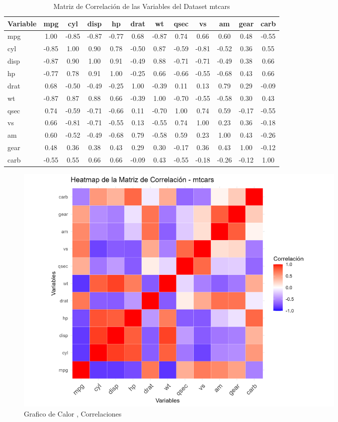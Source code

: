 \documentclass{article}
\begin{document}
\begin{table}[h]
	\centering
	\begin{tabular}{lccccccccccc}
		\hline
		Variable & mpg   & cyl   & disp  & hp    & drat  & wt    & qsec  & vs    & am    & gear  & carb  \\ \hline
		mpg      & 1.00  & -0.85 & -0.87 & -0.77 & 0.68  & -0.87 & 0.74  & 0.66  & 0.60  & 0.48  & -0.55 \\
		cyl      & -0.85 & 1.00  & 0.90  & 0.78  & -0.50 & 0.87  & -0.59 & -0.81 & -0.52 & 0.36  & 0.55  \\
		disp     & -0.87 & 0.90  & 1.00  & 0.91  & -0.49 & 0.88  & -0.71 & -0.71 & -0.49 & 0.38  & 0.66  \\
		hp       & -0.77 & 0.78  & 0.91  & 1.00  & -0.25 & 0.66  & -0.66 & -0.55 & -0.68 & 0.43  & 0.66  \\
		drat     & 0.68  & -0.50 & -0.49 & -0.25 & 1.00  & -0.39 & 0.11  & 0.13  & 0.79  & 0.29  & -0.09 \\
		wt       & -0.87 & 0.87  & 0.88  & 0.66  & -0.39 & 1.00  & -0.70 & -0.55 & -0.58 & 0.30  & 0.43  \\
		qsec     & 0.74  & -0.59 & -0.71 & -0.66 & 0.11  & -0.70 & 1.00  & 0.74  & 0.59  & -0.17 & -0.55 \\
		vs       & 0.66  & -0.81 & -0.71 & -0.55 & 0.13  & -0.55 & 0.74  & 1.00  & 0.23  & 0.36  & -0.18 \\
		am       & 0.60  & -0.52 & -0.49 & -0.68 & 0.79  & -0.58 & 0.59  & 0.23  & 1.00  & 0.43  & -0.26 \\
		gear     & 0.48  & 0.36  & 0.38  & 0.43  & 0.29  & 0.30  & -0.17 & 0.36  & 0.43  & 1.00  & -0.12 \\
		carb     & -0.55 & 0.55  & 0.66  & 0.66  & -0.09 & 0.43  & -0.55 & -0.18 & -0.26 & -0.12 & 1.00  \\ \hline
	\end{tabular}
	\caption{Matriz de Correlación de las Variables del Dataset mtcars}
	\label{tab:correlation_matrix}
\end{table}

\begin{figure}[h] %
	\centering %
	\includegraphics[width=0.8\textwidth]{heatmap_correlation_mtcars.png}
	\caption{Grafico de Calor , Correlaciones } %
	\label{fig:mi_imagen} %
\end{figure}
\end{document}
